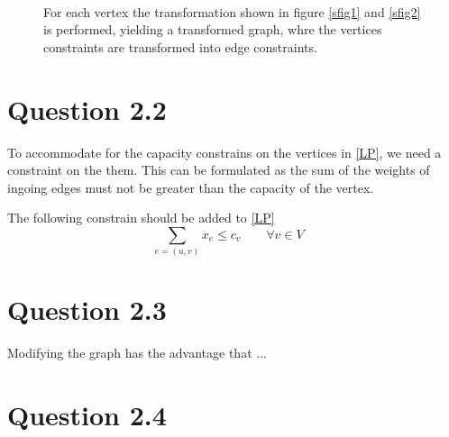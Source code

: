 \documentclass[10pt]{article}
\begin{document}
\begin{figure}[ht]
\centering
\mbox{
     \quad
}                    
\caption{For each vertex the transformation shown in figure \ref{sfig1} and \ref{sfig2} is performed, yielding a transformed graph, whre the vertices constraints are transformed into edge constraints.}
\label{fig1}
\end{figure}



\section*{Question 2.2} %
\label{sec:question_2_2}
To accommodate for the capacity constrains on the vertices in \eqref{LP}, we need a constraint on the them.
This can be formulated as the sum of the weights of ingoing edges must not be greater than the capacity of the vertex.

The following constrain should be added to \eqref{LP}
\begin{equation}
	\sum_{e=(u,v)} x_e \leq c_v \qquad \forall v \in V \quad 
\end{equation} 

\section*{Question 2.3} %
\label{sec:question_2_3}
Modifying the graph has the advantage that ...

\section*{Question 2.4} %
\label{sec:question_2_4}
\end{document}
